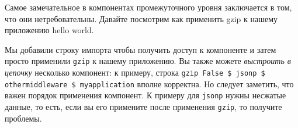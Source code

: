 Самое замечательное в компонентах промежуточного уровня заключается в том, что они нетребовательны. Давайте посмотрим
как применить gzip к нашему приложению hello world.



Мы добавили строку импорта чтобы получить доступ к компоненте и затем просто применили \lstinline!gzip!
к нашему приложению. Вы также можете \emph{выстроить в цепочку} несколько компонент:
к примеру, строка \lstinline{gzip False $ jsonp $ othermiddleware $ myapplication}
вполне корректна. Но следует заметить, что важен порядок применения компонент. К примеру
для \lstinline!jsonp! нужны несжатые данные, то есть, если вы его примените после применения \lstinline!gzip!,
то получите проблемы.

